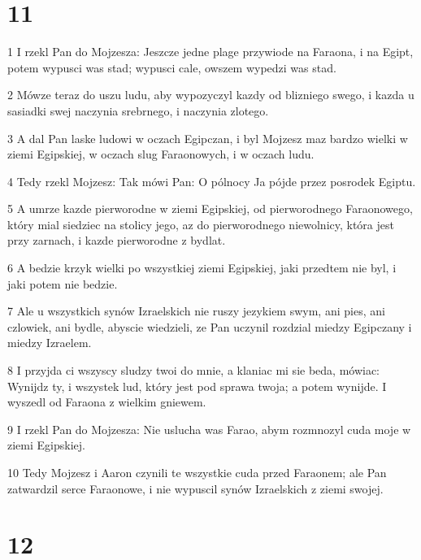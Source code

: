 \chapter{11}

\par 1 I rzekl Pan do Mojzesza: Jeszcze jedne plage przywiode na Faraona, i na Egipt, potem wypusci was stad; wypusci cale, owszem wypedzi was stad.
\par 2 Mówze teraz do uszu ludu, aby wypozyczyl kazdy od blizniego swego, i kazda u sasiadki swej naczynia srebrnego, i naczynia zlotego.
\par 3 A dal Pan laske ludowi w oczach Egipczan, i byl Mojzesz maz bardzo wielki w ziemi Egipskiej, w oczach slug Faraonowych, i w oczach ludu.
\par 4 Tedy rzekl Mojzesz: Tak mówi Pan: O pólnocy Ja pójde przez posrodek Egiptu.
\par 5 A umrze kazde pierworodne w ziemi Egipskiej, od pierworodnego Faraonowego, który mial siedziec na stolicy jego, az do pierworodnego niewolnicy, która jest przy zarnach, i kazde pierworodne z bydlat.
\par 6 A bedzie krzyk wielki po wszystkiej ziemi Egipskiej, jaki przedtem nie byl, i jaki potem nie bedzie.
\par 7 Ale u wszystkich synów Izraelskich nie ruszy jezykiem swym, ani pies, ani czlowiek, ani bydle, abyscie wiedzieli, ze Pan uczynil rozdzial miedzy Egipczany i miedzy Izraelem.
\par 8 I przyjda ci wszyscy sludzy twoi do mnie, a klaniac mi sie beda, mówiac: Wynijdz ty, i wszystek lud, który jest pod sprawa twoja; a potem wynijde. I wyszedl od Faraona z wielkim gniewem.
\par 9 I rzekl Pan do Mojzesza: Nie uslucha was Farao, abym rozmnozyl cuda moje w ziemi Egipskiej.
\par 10 Tedy Mojzesz i Aaron czynili te wszystkie cuda przed Faraonem; ale Pan zatwardzil serce Faraonowe, i nie wypuscil synów Izraelskich z ziemi swojej.

\chapter{12}

